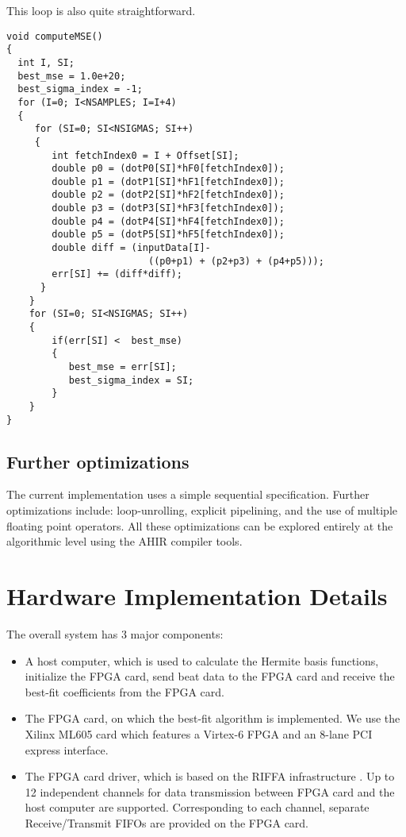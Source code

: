 \documentclass[runningheads]{llncs}
\begin{document}
This loop is also quite straightforward.
\begin{verbatim}
void computeMSE()
{
  int I, SI;
  best_mse = 1.0e+20;
  best_sigma_index = -1;
  for (I=0; I<NSAMPLES; I=I+4)
  {
     for (SI=0; SI<NSIGMAS; SI++)
     {
        int fetchIndex0 = I + Offset[SI]; 
        double p0 = (dotP0[SI]*hF0[fetchIndex0]);
        double p1 = (dotP1[SI]*hF1[fetchIndex0]);
        double p2 = (dotP2[SI]*hF2[fetchIndex0]);
        double p3 = (dotP3[SI]*hF3[fetchIndex0]);
        double p4 = (dotP4[SI]*hF4[fetchIndex0]);
        double p5 = (dotP5[SI]*hF5[fetchIndex0]);
        double diff = (inputData[I]-
                         ((p0+p1) + (p2+p3) + (p4+p5)));
        err[SI] += (diff*diff);
      }
    }
    for (SI=0; SI<NSIGMAS; SI++)
    {
        if(err[SI] <  best_mse)
        {
           best_mse = err[SI];
           best_sigma_index = SI;
        }
    }
}
\end{verbatim}


\subsection{Further optimizations}

The current implementation uses a simple sequential specification.
Further optimizations include: loop-unrolling, explicit pipelining,
and the use of multiple floating point operators.  All these optimizations
can be explored entirely at the algorithmic level using the AHIR
compiler tools.

\section{Hardware Implementation Details}\label{s:implementation}

The overall system has 3 major components:
\begin{itemize}
\item A host computer, which is used to calculate the Hermite basis functions,
initialize the FPGA card, send beat data to the FPGA card and receive
the best-fit coefficients from the FPGA card.
\item The FPGA card, on which the best-fit algorithm is implemented.   We use the
Xilinx ML605 card which features a Virtex-6 FPGA and an 8-lane PCI express interface.
\item The FPGA card driver, which is based on the RIFFA infrastructure \cite{j:jacobsen13}. 
Up to 12 independent channels for data transmission between FPGA card and the host
computer are supported. Corresponding to each channel, separate Receive/Transmit FIFOs
are provided on the FPGA card. 
\end{itemize}
\end{document}
